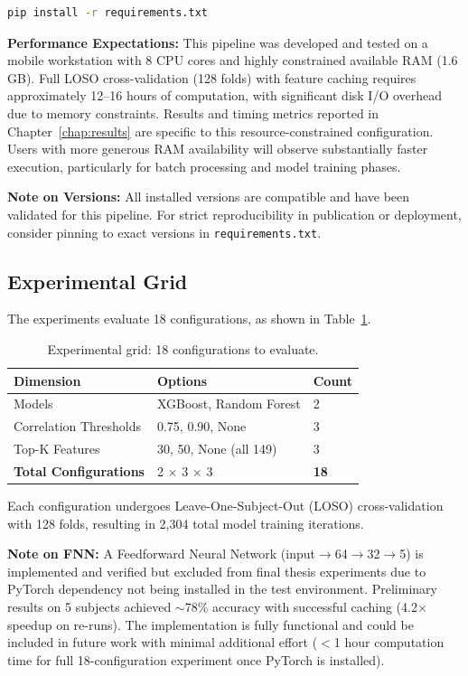 \documentclass{imc-inf} %
\begin{document}
\begin{lstlisting}[language=bash]
pip install -r requirements.txt
\end{lstlisting}

\textbf{Performance Expectations:} This pipeline was developed and tested on a mobile workstation with 8 CPU cores and highly constrained available RAM (1.6 GB). Full LOSO cross-validation (128 folds) with feature caching requires approximately 12--16 hours of computation, with significant disk I/O overhead due to memory constraints. Results and timing metrics reported in Chapter~\ref{chap:results} are specific to this resource-constrained configuration. Users with more generous RAM availability will observe substantially faster execution, particularly for batch processing and model training phases.

\textbf{Note on Versions:} All installed versions are compatible and have been validated for this pipeline. For strict reproducibility in publication or deployment, consider pinning to exact versions in \texttt{requirements.txt}.
\subsection{Experimental Grid}

The experiments evaluate 18 configurations, as shown in Table~\ref{tab:exp_grid}.

\begin{table}[ht]
\centering
\begin{tabular}{|l|l|l|}
\hline
\textbf{Dimension} & \textbf{Options} & \textbf{Count} \\
\hline
Models & XGBoost, Random Forest & 2 \\
\hline
Correlation Thresholds & 0.75, 0.90, None & 3 \\
\hline
Top-K Features & 30, 50, None (all 149) & 3 \\
\hline
\textbf{Total Configurations} & 2 $\times$ 3 $\times$ 3 & \textbf{18} \\
\hline
\end{tabular}
\caption{Experimental grid: 18 configurations to evaluate.}
\label{tab:exp_grid}
\end{table}

Each configuration undergoes Leave-One-Subject-Out (LOSO) cross-validation with 128 folds, resulting in 2,304 total model training iterations.

\textbf{Note on FNN:} A Feedforward Neural Network (input$\rightarrow$64$\rightarrow$32$\rightarrow$5) 
is implemented and verified but excluded from final thesis experiments due to 
PyTorch dependency not being installed in the test environment. Preliminary 
results on 5 subjects achieved $\sim$78\% accuracy with successful caching 
(4.2$\times$ speedup on re-runs). The implementation is fully functional and 
could be included in future work with minimal additional effort ($<$1 hour 
computation time for full 18-configuration experiment once PyTorch is installed).
\end{document}
